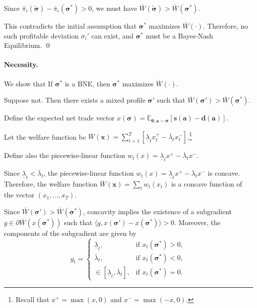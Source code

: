 \documentclass[12pt, notitlepage]{article}
\begin{document}
Since \(\bar{\pi}_i(\tilde{\boldsymbol{\sigma}}) - \bar{\pi}_i(\boldsymbol{\sigma}^*) > 0\), we must have   $\bar{W}(\tilde{\boldsymbol{\sigma}}) > \bar{W}(\boldsymbol{\sigma}^*).  $ 

This contradicts the initial assumption that \(\boldsymbol{\sigma}^*\) maximizes \(\bar{W}(\cdot)\). Therefore, no such profitable deviation \(\sigma_i'\) can exist, and \(\boldsymbol{\sigma}^*\) must be a Bayes-Nash Equilibrium.  \qed 


\paragraph{Necessity.} We show that If \(\boldsymbol{\sigma}^*\) is a BNE, then \(\boldsymbol{\sigma}^*\)  maximizes \(\bar{W}(\cdot)\).  \medskip{}

\noindent{}Suppose not. Then there exists a mixed profile $ \boldsymbol{\sigma}'$ such that $\bar{W}(\boldsymbol{\sigma}') > \bar{W}(\boldsymbol{\sigma}^*)$.

Define the expected net trade vector $x(\boldsymbol{\sigma}) = \mathbb{E}_{\boldsymbol{\theta}, \boldsymbol{a} \sim \boldsymbol{\sigma}}[\mathbf{s}(\boldsymbol{a}) - \mathbf{d}(\boldsymbol{a})]$.

Let the welfare function be $\bar{W}(\mathbf{x}) = \sum_{t=1}^T [\underline{\lambda}_t x_t^+ - \overline{\lambda}_t x_t^-]$.\footnote{Recall that $x^+=\max(x,0)$ and $x^-=\max(-x,0)$.} 

Define also the piecewise‑linear function \(w_t(x) = \underline{\lambda}_t x^+ - \overline{\lambda}_t x^-\). 

Since \(\underline{\lambda}_t < \overline{\lambda}_t\), the piecewise‑linear function \(w_t(x) = \underline{\lambda}_t x^+ - \overline{\lambda}_t x^-\) is concave. Therefore, the welfare function   $\bar{W}(\mathbf{x}) = \sum_t w_t(x_t)$  is a concave function of the vector \((x_1,\dots,x_T)\).

Since $\bar{W}(\boldsymbol{\sigma}') > \bar{W}(\boldsymbol{\sigma}^*)$, concavity implies the existence of a subgradient $g \in \partial\bar{W}(x(\boldsymbol{\sigma}^*))$ such that $\langle g, x(\boldsymbol{\sigma}') - x(\boldsymbol{\sigma}^*) \rangle > 0$. Moreover, the components of the subgradient are given by  
\[
g_t =
\begin{cases}
\underline{\lambda}_t, & \text{if } x_t(\boldsymbol{\sigma}^*) > 0, \\[2pt]
\overline{\lambda}_t, & \text{if } x_t(\boldsymbol{\sigma}^*) < 0, \\[2pt]
\in [\underline{\lambda}_t, \overline{\lambda}_t], & \text{if } x_t(\boldsymbol{\sigma}^*) = 0.
\end{cases} \]
\end{document}
